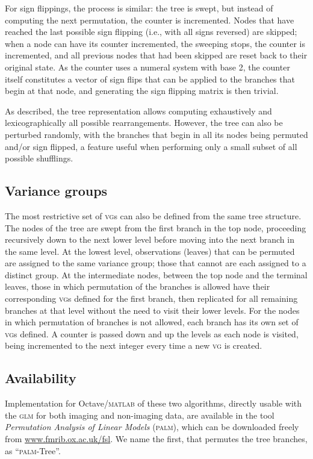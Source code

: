 For sign flippings, the process is similar: the tree is swept, but instead of computing the next permutation, the counter is incremented. Nodes that have reached the last possible sign flipping (i.e., with all signs reversed) are skipped; when a node can have its counter incremented, the sweeping stops, the counter is incremented, and all previous nodes that had been skipped are reset back to their original state. As the counter uses a numeral system with base 2, the counter itself constitutes a vector of sign flips that can be applied to the branches that begin at that node, and generating the sign flipping matrix is then trivial.

As described, the tree representation allows computing exhaustively and lexicographically all possible rearrangements. However, the tree can also be perturbed randomly, with the branches that begin in all its nodes being permuted and/or sign flipped, a feature useful when performing only a small subset of all possible shufflings.

\subsection{Variance groups}

The most restrictive set of \textsc{vg}s can also be defined from the same tree structure. The nodes of the tree are swept from the first branch in the top node, proceeding recursively down to the next lower level before moving into the next branch in the same level. At the lowest level, observations (leaves) that can be permuted are assigned to the same variance group; those that cannot are each assigned to a distinct group. At the intermediate nodes, between the top node and the terminal leaves, those in which permutation of the branches is allowed have their corresponding \textsc{vg}s defined for the first branch, then replicated for all remaining branches at that level without the need to visit their lower levels. For the nodes in which permutation of branches is not allowed, each branch has its own set of \textsc{vg}s defined. A counter is passed down and up the levels as each node is visited, being incremented to the next integer every time a new \textsc{vg} is created.

\subsection{Availability}

Implementation for Octave/\textsc{matlab} of these two algorithms, directly usable with the \textsc{glm} for both imaging and non-imaging data, are available in the tool \emph{Permutation Analysis of Linear Models} (\textsc{palm}), which can be downloaded freely from \href{http://www.fmrib.ox.ac.uk/fsl}{www.fmrib.ox.ac.uk/fsl}. We name the first, that permutes the tree branches, as ``\textsc{palm}-Tree''.

